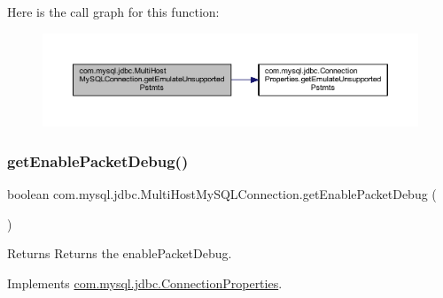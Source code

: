 Here is the call graph for this function\+:
\nopagebreak
\begin{figure}[H]
\begin{center}
\leavevmode
\includegraphics[width=350pt]{classcom_1_1mysql_1_1jdbc_1_1_multi_host_my_s_q_l_connection_a5c70d20e73b7ab4a471129a0f3c194fe_cgraph}
\end{center}
\end{figure}
\mbox{\label{classcom_1_1mysql_1_1jdbc_1_1_multi_host_my_s_q_l_connection_a4f5817273d152c100a22b77fa4cf957f}} 
\subsubsection{\texorpdfstring{get\+Enable\+Packet\+Debug()}{getEnablePacketDebug()}}
{\footnotesize\ttfamily boolean com.\+mysql.\+jdbc.\+Multi\+Host\+My\+S\+Q\+L\+Connection.\+get\+Enable\+Packet\+Debug (\begin{DoxyParamCaption}{ }\end{DoxyParamCaption})}

\begin{DoxyReturn}{Returns}
Returns the enable\+Packet\+Debug. 
\end{DoxyReturn}


Implements \mbox{\hyperlink{interfacecom_1_1mysql_1_1jdbc_1_1_connection_properties_accdc773d99a84b7b1db522aa324d6084}{com.\+mysql.\+jdbc.\+Connection\+Properties}}.

